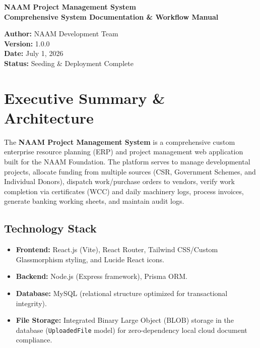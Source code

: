 \documentclass[11pt,a4paper]{article}
\begin{document}
\begin{titlepage}
    \centering
    \vspace*{2cm}
    {\Huge \bfseries \color{primary} NAAM Project Management System}\\[0.5cm]
    {\large \bfseries \color{secondary} Comprehensive System Documentation \& Workflow Manual}\\[1.5cm]
    
    \vfill
    
    \begin{minipage}{0.8\textwidth}
        \centering
        \textbf{Author:} NAAM Development Team\\
        \textbf{Version:} 1.0.0\\
        \textbf{Date:} July 1, 2026\\
        \textbf{Status:} Seeding \& Deployment Complete\\
    \end{minipage}
    
    \vfill
    \vspace*{2cm}
\end{titlepage}

\newpage
\tableofcontents
\newpage

\section{Executive Summary \& Architecture}
The \textbf{NAAM Project Management System} is a comprehensive custom enterprise resource planning (ERP) and project management web application built for the NAAM Foundation. The platform serves to manage developmental projects, allocate funding from multiple sources (CSR, Government Schemes, and Individual Donors), dispatch work/purchase orders to vendors, verify work completion via certificates (WCC) and daily machinery logs, process invoices, generate banking working sheets, and maintain audit logs.

\subsection{Technology Stack}
\begin{itemize}
    \item \textbf{Frontend:} React.js (Vite), React Router, Tailwind CSS/Custom Glassmorphism styling, and Lucide React icons.
    \item \textbf{Backend:} Node.js (Express framework), Prisma ORM.
    \item \textbf{Database:} MySQL (relational structure optimized for transactional integrity).
    \item \textbf{File Storage:} Integrated Binary Large Object (BLOB) storage in the database (\texttt{UploadedFile} model) for zero-dependency local cloud document compliance.
\end{itemize}
\end{document}
